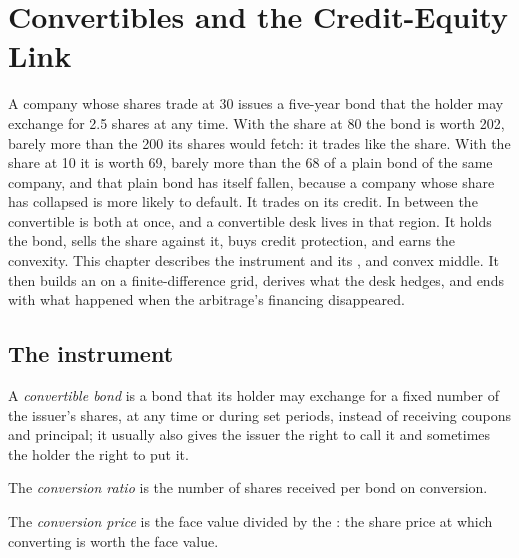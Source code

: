 \chapter{Convertibles and the Credit-Equity Link}\label{ch:dv:convertibles-and-the-credit-equity-link}

A company whose shares trade at 30 issues a five-year bond that the holder may exchange for 2.5 shares at any time. With the
share at 80 the bond is worth 202, barely more than the 200 its shares would fetch: it trades like the share. With the share at
10 it is worth 69, barely more than the 68 of a plain bond of the same company, and that plain bond has itself fallen, because a
company whose share has collapsed is more likely to default. It trades on its credit. In between the convertible is both at once,
and a convertible desk lives in that region. It holds the bond, sells the share against it, buys credit protection, and earns the
convexity. This chapter describes the instrument and its ,  and convex middle. It then builds an
 on a finite-difference grid, derives what the desk hedges, and ends with what happened when the arbitrage's
financing disappeared.

\section{The instrument}

\begin{definition}\label{def:dv:convertibles-and-the-credit-equity-link:cb}
A \emph{convertible bond} is a bond that its holder may exchange for a fixed number of the issuer's shares,
at any time or during set periods, instead of receiving coupons and principal; it usually also gives the issuer the right to call
it and sometimes the holder the right to put it.
\end{definition}

\begin{definition}\label{def:dv:convertibles-and-the-credit-equity-link:ratio}
The \emph{conversion ratio} is the number of shares received per bond on conversion.
\end{definition}

\begin{definition}\label{def:dv:convertibles-and-the-credit-equity-link:price}
The \emph{conversion price} is the face value divided by the : the share price at which
converting is worth the face value.
\end{definition}

